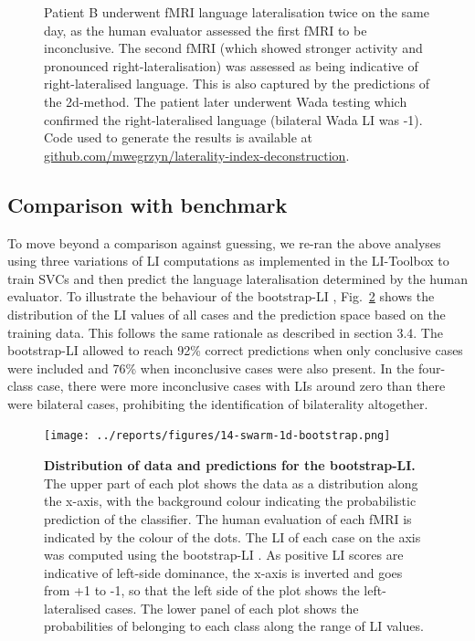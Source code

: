 \documentclass[fleqn,10pt]{SelfArx} %
\begin{document}
\begin{figure}[htbp]
\begin{minipage}{\textwidth}
{			Patient B underwent fMRI language lateralisation twice on the same day, as the human evaluator assessed the first fMRI to be inconclusive. The second fMRI (which showed stronger activity and pronounced right-lateralisation) was assessed as being indicative of right-lateralised language. This is also captured by the predictions of the 2d-method. The patient later underwent Wada testing which confirmed the right-lateralised language (bilateral Wada LI was -1).\\
			Code used to generate the results is available at \href{https://github.com/mwegrzyn/laterality-index-deconstruction}{github.com/mwegrzyn/laterality-index-deconstruction}.}%
		\label{fig:cases}
	\end{minipage}
\end{figure}

\subsection{Comparison with benchmark}
To move beyond a comparison against guessing, we re-ran the above analyses using three variations of LI computations as implemented in the LI-Toolbox \citep{Wilke_2007} to train SVCs and then predict the language lateralisation determined by the human evaluator. To illustrate the behaviour of the bootstrap-LI \citep{Wilke_2006}, Fig.~\ref{fig:swarmboot} shows the distribution of the LI values of all cases and the prediction space based on the training data. This follows the same rationale as described in section 3.4. The bootstrap-LI allowed to reach 92\% correct predictions when only conclusive cases were included and 76\% when inconclusive cases were also present. In the four-class case, there were more inconclusive cases with LIs around zero than there were bilateral cases, prohibiting the identification of bilaterality altogether.


\begin{figure}[htb]
	\begin{minipage}{\textwidth}
		\renewcommand{\familydefault}{\sfdefault}\normalfont
		\centering
		\texttt{[image: ../reports/figures/14-swarm-1d-bootstrap.png]}
		\caption{\textbf{Distribution of data and predictions for the bootstrap-LI.} 
			The upper part of each plot shows the data as a distribution along the x-axis, with the background colour indicating the probabilistic prediction of the classifier. The human evaluation of each fMRI is indicated by the colour of the dots. The LI of each case on the axis was computed using the bootstrap-LI \citep{Wilke_2006}. As positive LI scores are indicative of left-side dominance, the x-axis is inverted and goes from +1 to -1, so that the left side of the plot shows the left-lateralised cases. The lower panel of each plot shows the probabilities of belonging to each class along the range of LI values.}%
		\label{fig:swarmboot}
	\end{minipage}
\end{figure}
\end{document}
